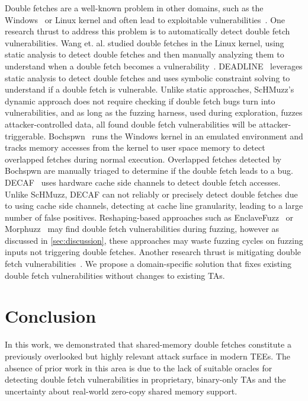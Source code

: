\documentclass[letterpaper,twocolumn,10pt]{article}
\newcommand{\sysname}{ScHMuzz\xspace}
\begin{document}
Double fetches are a well-known problem in other domains, such as 
the Windows~\cite{ms2008} or Linux kernel\cite{wang2017double} and often lead 
to exploitable vulnerabilities~\cite{warpattack,bochspwn}.
One research thrust to address this problem is to automatically detect double 
fetch vulnerabilities. Wang et. al. studied double fetches in the Linux kernel, 
using static analysis to detect double fetches and then manually analyzing them 
to understand when a double fetch becomes a vulnerability~\cite{wang2017double}. 
DEADLINE~\cite{deadline} leverages static analysis to detect double fetches and 
uses symbolic constraint solving to understand if a double fetch is vulnerable. 
Unlike static approaches, \sysname's 
dynamic approach does not require checking if double fetch bugs turn into 
vulnerabilities, and as long as the fuzzing harness, used 
during exploration, fuzzes attacker-controlled data, all found double fetch 
vulnerabilities will be attacker-triggerable. Bochspwn~\cite{bochspwn} runs 
the Windows kernel in an emulated environment and tracks memory accesses from the 
kernel to user space memory to detect overlapped fetches during normal execution. 
Overlapped fetches detected by Bochspwn are manually triaged to determine if the double 
fetch leads to a bug. DECAF~\cite{decaf} uses hardware cache side 
channels to detect double fetch accesses. Unlike \sysname, DECAF can not reliably 
or precisely detect double fetches due to using cache side channels, detecting at 
cache line granularity, leading to a large number of false positives. 
Reshaping-based approaches such as EnclaveFuzz~\cite{chen2024enclavefuzz} or 
Morphuzz~\cite{morphuzz} may find double fetch vulnerabilities during fuzzing, however 
as discussed in \autoref{sec:discussion}, these approaches may waste fuzzing cycles on 
fuzzing inputs not triggering double fetches. 
Another research thrust is mitigating double fetch vulnerabilities~\cite{midas,safefetch,decaf,dftinker}.
We propose a domain-specific solution that fixes existing double fetch vulnerabilities 
without changes to existing TAs.

\section{Conclusion}\label{sec:conclusion}

In this work, we demonstrated that shared-memory double fetches constitute a previously overlooked 
but highly relevant attack surface in modern TEEs. The absence of prior work 
in this area is due to the lack of suitable oracles for detecting double fetch 
vulnerabilities in proprietary, binary-only TAs and the uncertainty about real-world 
zero-copy shared memory support.
\end{document}
